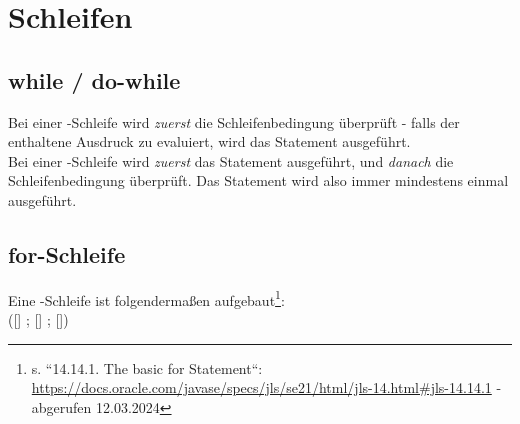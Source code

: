 \section{Schleifen}

\subsection{while / do-while}
Bei einer -Schleife wird \textit{zuerst} die Schleifenbedingung überprüft - falls der enthaltene Ausdruck zu  evaluiert, wird das Statement ausgeführt.\\

\noindent
Bei einer -Schleife wird \textit{zuerst} das Statement ausgeführt, und \textit{danach} die Schleifenbedingung überprüft.
Das Statement wird also immer mindestens einmal ausgeführt.\\

\subsection{for-Schleife}

Eine -Schleife ist folgendermaßen aufgebaut\footnote{
s. ``14.14.1. The basic for Statement``: \url{https://docs.oracle.com/javase/specs/jls/se21/html/jls-14.html#jls-14.14.1} - abgerufen 12.03.2024
}:\\

\noindent
{} ([] ; [] ; []) \\

